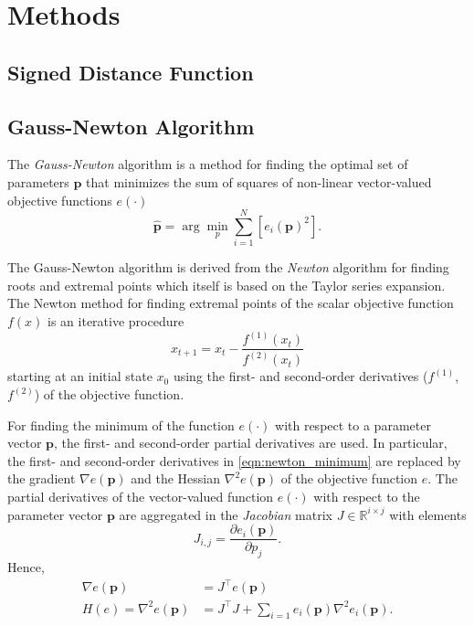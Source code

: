 \chapter{Methods}

\section{Signed Distance Function}


\section{Gauss-Newton Algorithm}

The \textit{Gauss-Newton} algorithm is a method for finding the optimal set of parameters $\mathbf{p}$ that minimizes the sum of squares of non-linear vector-valued objective functions $e(\cdot)$
%
\begin{equation}
\hat{\mathbf{p}} = \arg\min_{p} \sum_{i=1}^N\left[ e_i(\mathbf{p})^2\right] .
\end{equation}

The Gauss-Newton algorithm is derived from the \textit{Newton} algorithm for finding roots and extremal points which itself is based on the Taylor series expansion. The Newton method for finding extremal points of the scalar objective function $f(x)$ is an iterative procedure
%
\begin{equation}
x_{t+1} = x_t - \frac{f^{(1)}(x_t)}{f^{(2)}(x_t)}
\label{eqn:newton_minimum}
\end{equation}
%
starting at an initial state $x_0$ using the first- and second-order derivatives ($f^{(1)}$, $f^{(2)}$) of the objective function.

For finding the minimum of the function $e(\cdot)$ with respect to a parameter vector $\mathbf{p}$, the first- and second-order partial derivatives are used. In particular, the first- and second-order derivatives in \ref{eqn:newton_minimum} are replaced by the gradient $\nabla e(\mathbf{p})$ and the Hessian $\nabla^2 e(\mathbf{p})$ of the objective function $e$.
The partial derivatives of the vector-valued function $e(\cdot)$ with respect to the parameter vector $\mathbf{p}$ are aggregated in the \textit{Jacobian} matrix $J\in \mathbb{R}^{i \times j}$ with elements
%
\begin{equation}
J_{i,j} = \frac{\partial e_i(\mathbf{p})}{\partial p_j} .
\end{equation}
%
Hence,
\begin{align}
\nabla e(\mathbf{p}) &= J^\top e(\mathbf{p}) \label{eqn:gn_gradient}\\
H(e) = \nabla^2 e(\mathbf{p}) &= J^\top J +  \sum_{i=1} e_i(\mathbf{p}) \nabla^2 e_i(\mathbf{p}) \label{eqn:gn_hessian_full}.
\end{align}

